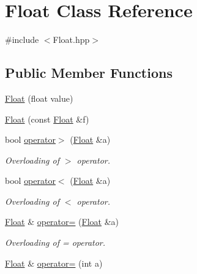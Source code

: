 \hypertarget{class_float}{\section{Float Class Reference}
\label{class_float}
}


{\ttfamily \#include $<$Float.\+hpp$>$}

\subsection*{Public Member Functions}
\begin{DoxyCompactItemize}
\item 
\hyperlink{class_float_ac5e141ba92d856c7e79aa4e66a745f37}{Float} (float value)
\item 
\hyperlink{class_float_a60856232c5ef354213ca4ecb475d8a6f}{Float} (const \hyperlink{class_float}{Float} \&f)
\item 
\hypertarget{class_float_a53950aae3831a057894e66bc11540e42}{bool \hyperlink{class_float_a53950aae3831a057894e66bc11540e42}{operator$>$} (\hyperlink{class_float}{Float} \&a)}\label{class_float_a53950aae3831a057894e66bc11540e42}

\begin{DoxyCompactList}\small\item\em Overloading of $>$ operator. \end{DoxyCompactList}\item 
\hypertarget{class_float_a89df599677d326b8d7cd79f66a1f9bab}{bool \hyperlink{class_float_a89df599677d326b8d7cd79f66a1f9bab}{operator$<$} (\hyperlink{class_float}{Float} \&a)}\label{class_float_a89df599677d326b8d7cd79f66a1f9bab}

\begin{DoxyCompactList}\small\item\em Overloading of $<$ operator. \end{DoxyCompactList}\item 
\hypertarget{class_float_a4a77c416294ca66c1be47e2aa58902c8}{\hyperlink{class_float}{Float} \& \hyperlink{class_float_a4a77c416294ca66c1be47e2aa58902c8}{operator=} (\hyperlink{class_float}{Float} \&a)}\label{class_float_a4a77c416294ca66c1be47e2aa58902c8}

\begin{DoxyCompactList}\small\item\em Overloading of = operator. \end{DoxyCompactList}\item 
\hypertarget{class_float_a9fde2d75790d8c51813e3bc3cb11112b}{\hyperlink{class_float}{Float} \& \hyperlink{class_float_a9fde2d75790d8c51813e3bc3cb11112b}{operator=} (int a)}\label{class_float_a9fde2d75790d8c51813e3bc3cb11112b}


\end{DoxyCompactItemize}

